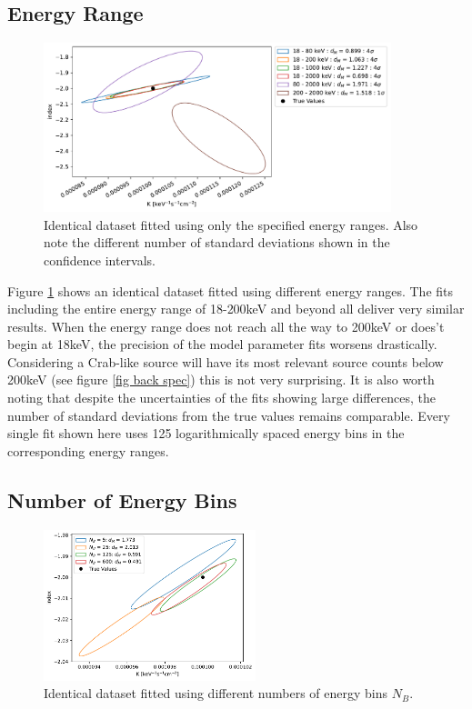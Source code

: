 \documentclass{report}
\begin{document}
\FloatBarrier

\subsection{Energy Range}

\begin{figure}[H]
  \centering
  \includegraphics[width=0.9\textwidth]{Images/Pure_Simulation/combined_plot_energy_range.pdf}
  \caption{Identical dataset fitted using only the specified energy ranges. Also note the different number of standard deviations shown in the confidence intervals.}
  \label{fig energy range}
\end{figure}

Figure \ref{fig energy range} shows an identical dataset fitted using different energy ranges. The fits including the entire energy range of 18-200keV and beyond all deliver very similar results. When the energy range does not reach all the way to 200keV or does't begin at 18keV, the precision of the model parameter fits worsens drastically. Considering a Crab-like source will have its most relevant source counts below 200keV (see figure \ref{fig back spec}) this is not very surprising. It is also worth noting that despite the uncertainties of the fits showing large differences, the number of standard deviations from the true values remains comparable. Every single fit shown here uses 125 logarithmically spaced energy bins in the corresponding energy ranges.




\subsection{Number of Energy Bins}

\begin{figure}[h]
  \centering
  \includegraphics[width=0.55\textwidth]{Images/Pure_Simulation/combined_plot_num_e_bins.pdf}
  \caption{Identical dataset fitted using different numbers of energy bins $N_B$.}
  \label{fig num bins}
\end{figure}
\end{document}
